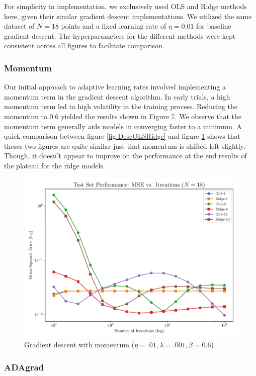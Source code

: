 \documentclass[twocolumn,aps]{revtex4}
\begin{document}
For simplicity in implementation, we exclusively used OLS and Ridge methods here, given their similar gradient descent implementations. 
We utilized the same dataset of $N=18$ points and a fixed learning rate of $\eta=0.01$ for baseline gradient descent. 
The hyperparameters for the different methods were kept consistent across all figures to facilitate comparison.

\subsubsection{Momentum}

Our initial approach to adaptive learning rates involved implementing a momentum term in the gradient descent algorithm. 
In early trials, a high momentum term led to high volatility in the training process. 
Reducing the momentum to $0.6$ yielded the results shown in Figure 7. 
We observe that the momentum term generally aids models in converging faster to a minimum.
A quick comparison between figure \ref{fig:DescOLSRidge} and figure \ref{fig:GradMomentum} shows that theses two figures are quite similar just that momentum is shifted left slightly.
Though, it doesn't appear to improve on the performance at the end results of the plateau for the ridge models.
\\
\begin{figure}[h]
    \centering
    \includegraphics[width=.95 \linewidth]{Figures/OLS_Ridge_Momentum.pdf}
    \caption{Gradient descent with momentum ($\eta=.01, \lambda=.001, \beta=0.6$)}
    \label{fig:GradMomentum}
\end{figure}


\subsubsection{ADAgrad}
\end{document}
